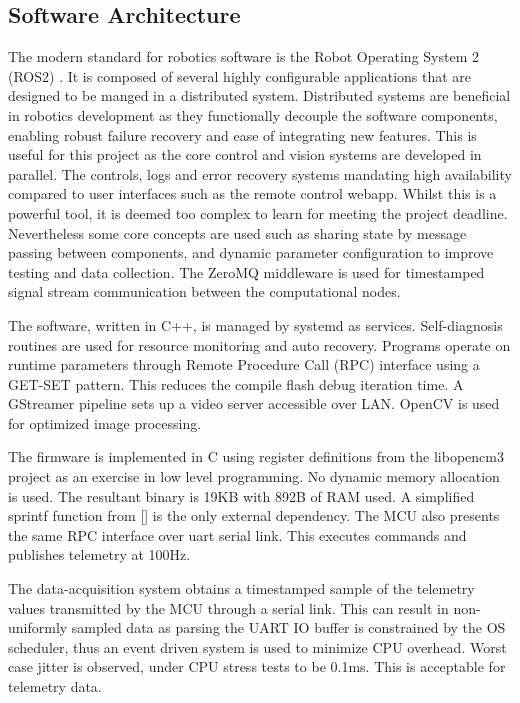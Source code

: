         \subsection{Software Architecture}
        The modern standard for robotics software is the Robot Operating System 2 (ROS2) \cite{Macenski2022RobotOS}. 
        It is composed of several highly configurable applications that are designed to be manged in a distributed system.
        Distributed systems are beneficial in robotics development as they functionally decouple the software components, 
        enabling robust failure recovery and ease of integrating new features. This is useful for this project as 
        the core control and vision systems are developed in parallel. The controls, logs and error recovery systems mandating 
        high availability compared to user interfaces such as the remote control webapp. 
        Whilst this is a powerful tool, it is deemed too complex to learn for meeting the project deadline.
        Nevertheless some core concepts are used such as sharing state by message passing between components, 
        and dynamic parameter configuration to improve testing and data collection. The ZeroMQ middleware is used for 
        timestamped signal stream communication between the computational nodes. 

        The software, written in C++, is managed by systemd as services. 
        Self-diagnosis routines are used for resource monitoring and auto recovery. 
        Programs operate on runtime parameters through Remote Procedure Call (RPC) 
        interface using a GET-SET pattern. This reduces the 
        compile flash debug iteration time. A GStreamer pipeline sets up a video 
        server accessible over LAN. OpenCV is used for optimized image processing.
      
        The firmware is implemented in C using register definitions from the 
        libopencm3 project \cite{BeginningSTM32} as an exercise in low level programming. 
        No dynamic memory allocation is used.
        The resultant binary is 19KB with 892B of RAM used.
        A simplified sprintf function from [] is the only external dependency.
        The MCU also presents the same RPC interface over uart serial link.
        This executes commands and publishes telemetry at 100Hz.

        The data-acquisition system obtains a timestamped sample of the 
        telemetry values transmitted by the MCU through a serial link.
        This can result in non-uniformly sampled data as parsing the UART IO buffer 
        is constrained by the OS scheduler, thus an event driven system is used to 
        minimize CPU overhead. Worst case jitter is observed, under CPU stress 
        tests to be 0.1ms. This is acceptable for telemetry data. 
        \pagebreak{}
